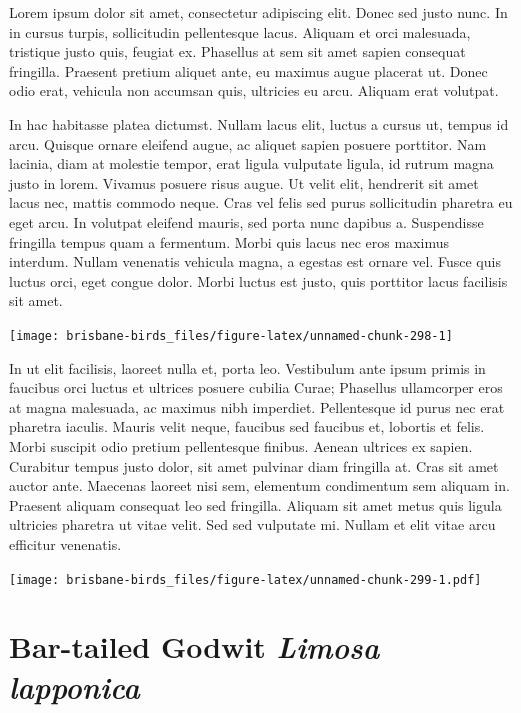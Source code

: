 \documentclass[]{book}
\let\origfigure\figure
\let\endorigfigure\endfigure
\renewenvironment{figure}[1][2] {
  \expandafter\origfigure\expandafter[H]
} {
  \endorigfigure
}
\begin{document}
Lorem ipsum dolor sit amet, consectetur adipiscing elit. Donec sed justo
nunc. In in cursus turpis, sollicitudin pellentesque lacus. Aliquam et
orci malesuada, tristique justo quis, feugiat ex. Phasellus at sem sit
amet sapien consequat fringilla. Praesent pretium aliquet ante, eu
maximus augue placerat ut. Donec odio erat, vehicula non accumsan quis,
ultricies eu arcu. Aliquam erat volutpat.

In hac habitasse platea dictumst. Nullam lacus elit, luctus a cursus ut,
tempus id arcu. Quisque ornare eleifend augue, ac aliquet sapien posuere
porttitor. Nam lacinia, diam at molestie tempor, erat ligula vulputate
ligula, id rutrum magna justo in lorem. Vivamus posuere risus augue. Ut
velit elit, hendrerit sit amet lacus nec, mattis commodo neque. Cras vel
felis sed purus sollicitudin pharetra eu eget arcu. In volutpat eleifend
mauris, sed porta nunc dapibus a. Suspendisse fringilla tempus quam a
fermentum. Morbi quis lacus nec eros maximus interdum. Nullam venenatis
vehicula magna, a egestas est ornare vel. Fusce quis luctus orci, eget
congue dolor. Morbi luctus est justo, quis porttitor lacus facilisis sit
amet.

\begin{figure}
\texttt{[image: brisbane-birds\_files/figure-latex/unnamed-chunk-298-1]} \caption{insert figure caption}\label{fig:unnamed-chunk-298}
\end{figure}

In ut elit facilisis, laoreet nulla et, porta leo. Vestibulum ante ipsum
primis in faucibus orci luctus et ultrices posuere cubilia Curae;
Phasellus ullamcorper eros at magna malesuada, ac maximus nibh
imperdiet. Pellentesque id purus nec erat pharetra iaculis. Mauris velit
neque, faucibus sed faucibus et, lobortis et felis. Morbi suscipit odio
pretium pellentesque finibus. Aenean ultrices ex sapien. Curabitur
tempus justo dolor, sit amet pulvinar diam fringilla at. Cras sit amet
auctor ante. Maecenas laoreet nisi sem, elementum condimentum sem
aliquam in. Praesent aliquam consequat leo sed fringilla. Aliquam sit
amet metus quis ligula ultricies pharetra ut vitae velit. Sed sed
vulputate mi. Nullam et elit vitae arcu efficitur venenatis.

\begin{figure}
\centering
\texttt{[image: brisbane-birds\_files/figure-latex/unnamed-chunk-299-1.pdf]}
\caption{\label{fig:unnamed-chunk-299}insert figure caption}
\end{figure}

\section{\texorpdfstring{Bar-tailed Godwit \emph{Limosa
lapponica}}{Bar-tailed Godwit Limosa lapponica}}\label{bar-tailed-godwit-limosa-lapponica}
\end{document}
